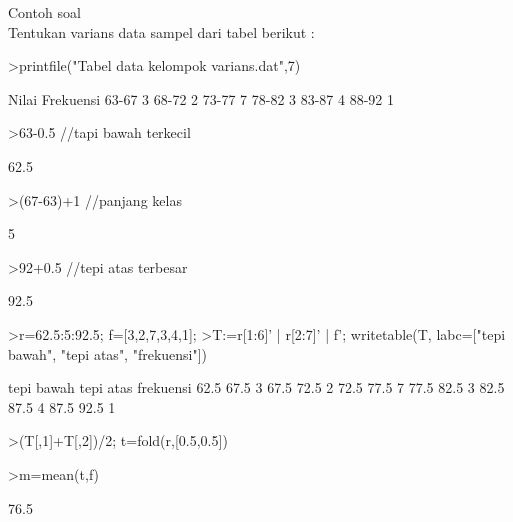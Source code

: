 \documentclass[a4paper,10pt]{article}
\begin{document}
\begin{eulernotebook}
\begin{eulercomment}
\begin{eulercomment}
\begin{eulercomment}
\begin{eulercomment}
\begin{eulercomment}
\begin{eulercomment}
\begin{eulercomment}
\begin{eulercomment}
\begin{eulercomment}
\begin{eulercomment}
\begin{eulercomment}
\begin{eulercomment}
\begin{eulercomment}
Contoh soal\\
Tentukan varians data sampel dari tabel berikut :
\end{eulercomment}
\begin{eulerprompt}
>printfile("Tabel data kelompok varians.dat",7) 
\end{eulerprompt}
\begin{euleroutput}
     Nilai          Frekuensi
     63-67              3
     68-72              2
     73-77              7
     78-82              3
     83-87              4
     88-92              1
\end{euleroutput}
\begin{eulerprompt}
>63-0.5  //tapi bawah terkecil
\end{eulerprompt}
\begin{euleroutput}
  62.5
\end{euleroutput}
\begin{eulerprompt}
>(67-63)+1  //panjang kelas
\end{eulerprompt}
\begin{euleroutput}
  5
\end{euleroutput}
\begin{eulerprompt}
>92+0.5  //tepi atas terbesar
\end{eulerprompt}
\begin{euleroutput}
  92.5
\end{euleroutput}
\begin{eulerprompt}
>r=62.5:5:92.5; f=[3,2,7,3,4,1];
>T:=r[1:6]' | r[2:7]' | f'; writetable(T, labc=["tepi bawah", "tepi atas", "frekuensi"])
\end{eulerprompt}
\begin{euleroutput}
   tepi bawah tepi atas frekuensi
         62.5      67.5         3
         67.5      72.5         2
         72.5      77.5         7
         77.5      82.5         3
         82.5      87.5         4
         87.5      92.5         1
\end{euleroutput}
\begin{eulerprompt}
>(T[,1]+T[,2])/2; t=fold(r,[0.5,0.5]) 
\end{eulerprompt}
\begin{euleroutput}
  [65,  70,  75,  80,  85,  90]
\end{euleroutput}
\begin{eulerprompt}
>m=mean(t,f)
\end{eulerprompt}
\begin{euleroutput}
  76.5
\end{euleroutput}

\end{eulercomment}
\end{eulercomment}
\end{eulercomment}
\end{eulercomment}
\end{eulercomment}
\end{eulercomment}
\end{eulercomment}
\end{eulercomment}
\end{eulercomment}
\end{eulercomment}
\end{eulercomment}
\end{eulercomment}
\end{eulernotebook}
\end{document}
